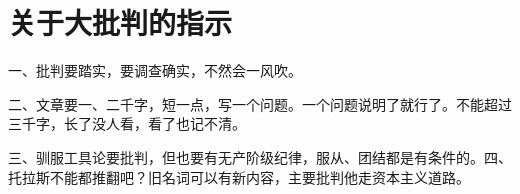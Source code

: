 \section[关于大批判的指示（一九六七年三月）]{关于大批判的指示}


一、批判要踏实，要调查确实，不然会一风吹。

二、文章要一、二千字，短一点，写一个问题。一个问题说明了就行了。不能超过三千字，长了没人看，看了也记不清。

三、驯服工具论要批判，但也要有无产阶级纪律，服从、团结都是有条件的。四、托拉斯不能都推翻吧？旧名词可以有新内容，主要批判他走资本主义道路。


